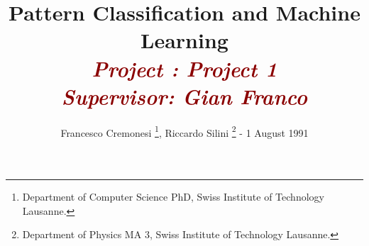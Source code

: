 \documentclass[%
	11pt,%
	a4paper,%
	onside,%
	headinclude,%
	footinclude,%
	BCOR5mm,%
	captions=tableheading]%
		{scrartcl}
\newcommand{\frontmatter}{%
  \clearpage																%
  \pagenumbering{arabic}													%
  \edef\computelastpage{%
  \uppercase{\the\numexpr\getpagerefnumber{LastFrontPage}-1\relax}}}				%
\begin{document}
\makeatletter
\renewcommand{\maketitle}{\bgroup\setlength{\parindent}{0pt}
\begin{flushleft}
  \textbf{\@title}

  \@author
\end{flushleft}\egroup
}
\makeatother

\title{\huge{Pattern Classification and Machine Learning}\\[5pt]\textcolor{darkred}{\textbf{\large{\emph{Project : Project 1\\ Supervisor: Gian Franco}}}}}

\author{%
\vspace{10pt}Francesco Cremonesi \footnote{\label{note1}Department of Computer Science PhD, Swiss Institute of Technology Lausanne.}, Riccardo Silini \footnote{Department of Physics MA $3$, Swiss Institute of Technology Lausanne.} - 1 August 1991}

\frontmatter


\maketitle


\vspace{.5cm}
\end{document}
